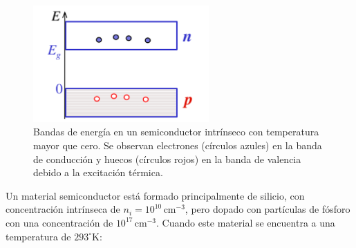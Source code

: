 \documentclass[
  11pt,
  letterpaper,
   addpoints,
  ]{exam}
\begin{document}
\begin{questions}
\begin{solution}
    \begin{figure}[H]
        \centering
        \includegraphics[width=0.6\textwidth]{../figures/Auxiliar_2_6}
        \caption{Bandas de energía en un semiconductor intrínseco con temperatura mayor que cero. Se observan electrones (círculos azules) en la banda de conducción y huecos (círculos rojos) en la banda de valencia debido a la excitación térmica.}
        \label{fig:bandas_temp}
    \end{figure}

\end{solution}
\question
Un material semiconductor está formado principalmente de silicio, con concentración intrínseca de $n_i = 10^{10}\,\text{cm}^{-3}$, pero dopado con partículas de fósforo con una concentración de $10^{17}\,\text{cm}^{-3}$. Cuando este material se encuentra a una temperatura de $293^\circ \text{K}$:
\begin{solution}

\end{solution}
\end{questions}
\end{document}
